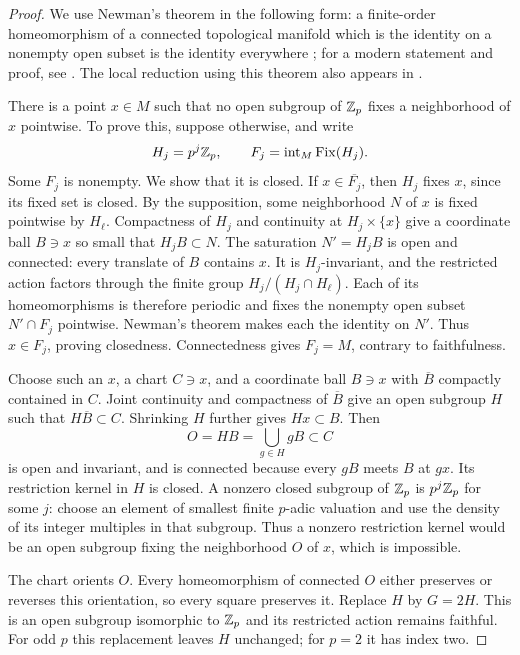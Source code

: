 \begin{proof}
We use Newman's theorem in the following form: a finite-order
homeomorphism of a connected topological manifold which is the
identity on a nonempty open subset is the identity everywhere
\cite{Newman1931}; for a modern statement and proof, see
\cite[author manuscript, pp.~2--3]{Pardon2019}. The local reduction using this
theorem also appears in \cite[\S4.1]{Pardon2013}.

There is a point $x\in M$ such that no open subgroup of $\mathbb Z_p$ fixes a
neighborhood of $x$ pointwise.  To prove this, suppose otherwise, and
write
\[
 H_j=p^j\mathbb Z_p,
 \qquad F_j=\operatorname{int}_M\operatorname{Fix}(H_j).
\]
Some $F_j$ is nonempty.  We show that it is closed.  If
$x\in\overline{F_j}$, then $H_j$ fixes $x$, since its fixed set is
closed.  By the supposition, some neighborhood $N$ of $x$ is fixed
pointwise by $H_\ell$.  Compactness of $H_j$ and continuity at
$H_j\times\{x\}$ give a coordinate ball $B\ni x$ so small that
$H_jB\subset N$.  The saturation $N'=H_jB$ is open and connected:
every translate of $B$ contains $x$.  It is $H_j$-invariant, and the
restricted action factors through the finite group
$H_j/(H_j\cap H_\ell)$.  Each of its homeomorphisms is therefore
periodic and fixes the nonempty open subset $N'\cap F_j$ pointwise.
Newman's theorem makes each the identity on $N'$.  Thus $x\in F_j$,
proving closedness.  Connectedness gives $F_j=M$, contrary to
faithfulness.

Choose such an $x$, a chart $C\ni x$, and a coordinate ball $B\ni x$
with $\overline B$ compactly contained in $C$.  Joint continuity and
compactness of $\overline B$ give an open subgroup $H$ such that
$H\overline B\subset C$.  Shrinking $H$ further gives $Hx\subset B$.
Then
\[
 O=HB=\bigcup_{g\in H}gB\subset C
\]
is open and invariant, and is connected because every $gB$ meets
$B$ at $gx$.  Its restriction kernel in $H$ is closed.  A nonzero
closed subgroup of $\mathbb Z_p$ is $p^j\mathbb Z_p$ for some $j$: choose an element
of smallest finite $p$-adic valuation and use the density of its
integer multiples in that subgroup.  Thus a nonzero restriction
kernel would be an open subgroup fixing the neighborhood $O$ of
$x$, which is impossible.

The chart orients $O$.  Every homeomorphism of connected $O$ either
preserves or reverses this orientation, so every square preserves
it.  Replace $H$ by $G=2H$.  This is an open subgroup isomorphic to
$\mathbb Z_p$ and its restricted action remains faithful.  For odd $p$ this
replacement leaves $H$ unchanged; for $p=2$ it has index two.
\end{proof}

